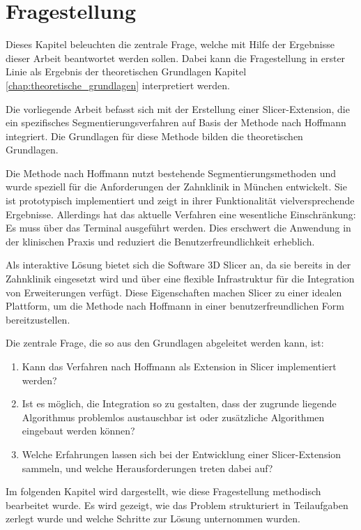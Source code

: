 \chapter{Fragestellung}
\label{chap:fragestellung} Dieses Kapitel beleuchten die zentrale Frage, welche
mit Hilfe der Ergebnisse dieser Arbeit beantwortet werden sollen. Dabei kann die
Fragestellung in erster Linie als Ergebnis der theoretischen Grundlagen Kapitel \ref{chap:theoretische_grundlagen}
interpretiert werden.

Die vorliegende Arbeit befasst sich mit der Erstellung einer Slicer-Extension,
die ein spezifisches Segmentierungsverfahren auf Basis der Methode nach Hoffmann
integriert. Die Grundlagen für diese Methode bilden die theoretischen Grundlagen.

Die Methode nach Hoffmann nutzt bestehende Segmentierungsmethoden und wurde speziell
für die Anforderungen der Zahnklinik in München entwickelt. Sie ist prototypisch
implementiert und zeigt in ihrer Funktionalität vielversprechende Ergebnisse. Allerdings
hat das aktuelle Verfahren eine wesentliche Einschränkung: Es muss über das
Terminal ausgeführt werden. Dies erschwert die Anwendung in der klinischen Praxis
und reduziert die Benutzerfreundlichkeit erheblich.

Als interaktive Lösung bietet sich die Software 3D Slicer an, da sie bereits in
der Zahnklinik eingesetzt wird und über eine flexible Infrastruktur für die
Integration von Erweiterungen verfügt. Diese Eigenschaften machen Slicer zu einer
idealen Plattform, um die Methode nach Hoffmann in einer benutzerfreundlichen
Form bereitzustellen.

Die zentrale Frage, die so aus den Grundlagen abgeleitet werden kann, ist:

\begin{enumerate}
	\item Kann das Verfahren nach Hoffmann als Extension in Slicer implementiert werden?

	\item Ist es möglich, die Integration so zu gestalten, dass der zugrunde liegende
		Algorithmus problemlos austauschbar ist oder zusätzliche Algorithmen eingebaut
		werden können?

	\item Welche Erfahrungen lassen sich bei der Entwicklung einer Slicer-Extension
		sammeln, und welche Herausforderungen treten dabei auf?
\end{enumerate}

Im folgenden Kapitel wird dargestellt, wie diese Fragestellung methodisch
bearbeitet wurde. Es wird gezeigt, wie das Problem strukturiert in Teilaufgaben
zerlegt wurde und welche Schritte zur Lösung unternommen wurden.
